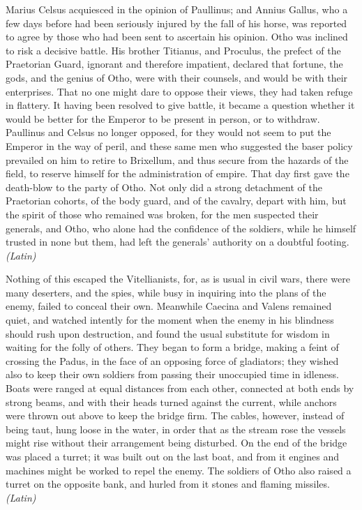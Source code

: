 Marius Celsus acquiesced in the opinion of Paullinus; and Annius Gallus, who a few days before had been seriously injured by the fall of his horse, was reported to agree by those who had been sent to ascertain his opinion. Otho was inclined to risk a decisive battle. His brother Titianus, and Proculus, the prefect of the Praetorian Guard, ignorant and therefore impatient, declared that fortune, the gods, and the genius of Otho, were with their counsels, and would be with their enterprises. That no one might dare to oppose their views, they had taken refuge in flattery. It having been resolved to give battle, it became a question whether it would be better for the Emperor to be present in person, or to withdraw. Paullinus and Celsus no longer opposed, for they would not seem to put the Emperor in the way of peril, and these same men who suggested the baser policy prevailed on him to retire to Brixellum, and thus secure from the hazards of the field, to reserve himself for the administration of empire. That day first gave the death-blow to the party of Otho. Not only did a strong detachment of the Praetorian cohorts, of the body guard, and of the cavalry, depart with him, but the spirit of those who remained was broken, for the men suspected their generals, and Otho, who alone had the confidence of the soldiers, while he himself trusted in none but them, had left the generals' authority on a doubtful footing. \emph{(Latin)}


Nothing of this escaped the Vitellianists, for, as is usual in civil wars, there were many deserters, and the spies, while busy in inquiring into the plans of the enemy, failed to conceal their own. Meanwhile Caecina and Valens remained quiet, and watched intently for the moment when the enemy in his blindness should rush upon destruction, and found the usual substitute for wisdom in waiting for the folly of others. They began to form a bridge, making a feint of crossing the Padus, in the face of an opposing force of gladiators; they wished also to keep their own soldiers from passing their unoccupied time in idleness. Boats were ranged at equal distances from each other, connected at both ends by strong beams, and with their heads turned against the current, while anchors were thrown out above to keep the bridge firm. The cables, however, instead of being taut, hung loose in the water, in order that as the stream rose the vessels might rise without their arrangement being disturbed. On the end of the bridge was placed a turret; it was built out on the last boat, and from it engines and machines might be worked to repel the enemy. The soldiers of Otho also raised a turret on the opposite bank, and hurled from it stones and flaming missiles. \emph{(Latin)}

